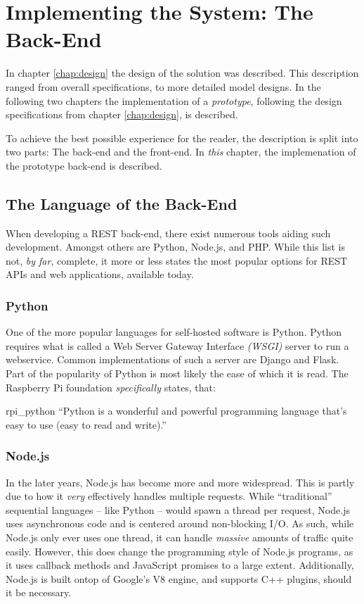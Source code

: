 \chapter{Implementing the System: The Back-End}
	\label{chap:impl:backend}
	In chapter \ref{chap:design} the design of the solution was described. This description ranged from overall specifications, to more detailed model designs. In the following two chapters the implementation of a \emph{prototype}, following the design specifications from chapter \ref{chap:design}, is described.

	To achieve the best possible experience for the reader, the description is split into two parts: The back-end and the front-end. In \emph{this} chapter, the implemenation of the prototype back-end is described.


	\section{The Language of the Back-End}
		When developing a REST back-end, there exist numerous tools aiding such development. Amongst others are Python, Node.js, and PHP. While this list is not, \emph{by far}, complete, it more or less states the most popular options for REST APIs and web applications, available today.

		\subsection{Python}
			One of the more popular languages for self-hosted software is Python. Python requires what is called a Web Server Gateway Interface \emph{(WSGI)} server to run a webservice. Common implementations of such a server are Django and Flask. Part of the popularity of Python is most likely the ease of which it is read. The Raspberry Pi foundation \emph{specifically} states, that:
			\begin{citequote}{rpi_python}
				``Python is a wonderful and powerful programming language that's easy to use (easy to read and write).''
			\end{citequote}

		\subsection{Node.js}
			In the later years, Node.js has become more and more widespread. This is partly due to how it \emph{very} effectively handles multiple requests. While ``traditional'' sequential languages -- like Python -- would spawn a thread per request, Node.js uses asynchronous code and is centered around non-blocking I/O. As such, while Node.js only ever uses one thread, it can handle \emph{massive} amounts of traffic quite easily. However, this does change the programming style of Node.js programs, as it uses callback methods and JavaScript promises to a large extent. Additionally, Node.js is built ontop of Google's V8 engine, and supports C++ plugins, should it be necessary.

